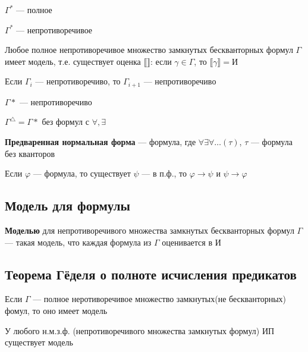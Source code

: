 \documentclass[english]{article}
\begin{document}
\begin{property}
	\(\Gamma^*\) --- полное
	\label{org2bcf8b7}
\end{property}
\begin{property}
	\(\Gamma^*\) --- непротиворечивое
	\label{org56a8999}
\end{property}
\begin{theorem}
	Любое полное непротиворечивое множество замкнутых бескванторных формул \(\Gamma\) имеет модель, т.е. существует оценка \(\llbracket \rrbracket\): если \(\gamma \in \Gamma\), то \(\llbracket \gamma \rrbracket = \text{И}\)
	\label{org725c6c0}
\end{theorem}
\begin{theorem}
	Если \(\Gamma_i\) --- непротиворечиво, то \(\Gamma_{i + 1}\) --- непротиворечиво
	\label{org693c96c}
\end{theorem}
\begin{theorem}
	\(\Gamma*\) --- непротиворечиво
	\label{orgd717523}
\end{theorem}
\begin{corollary}
	\(\Gamma^\triangle = \Gamma*\) без формул с \(\forall, \exists\)
	\label{org9267a44}
\end{corollary}
\begin{definition}
	\textbf{Предваренная нормальная форма} --- формула, где \(\forall \exists \forall \dots(\tau)\), \(\tau\) --- формула без кванторов
	\label{org50a2fe1}
\end{definition}
\begin{theorem}
	Если \(\varphi\) --- формула, то существует \(\psi\) --- в п.ф., то \(\varphi \to \psi\) и \(\psi \to \varphi\)
	\label{org04bf09a}
\end{theorem}
\subsection{Модель для формулы}
\label{sec:org5b2985d}
\begin{definition}
	\textbf{Моделью} для непротиворечивого множества замкнутых бескванторных формул \(\Gamma\) --- такая модель, что каждая формула из \(\Gamma\) оценивается в И
	\label{org8fc9248}
\end{definition}
\subsection{Теорема Гёделя о полноте исчисления предикатов}
\label{sec:org0391102}
\begin{theorem}
	Если \(\Gamma\) --- полное неротиворечивое множество замкнутых(не бескванторных) фомул, то оно имеет модель
	\label{org9a210a4}
\end{theorem}
\begin{theorem}
	У любого н.м.з.ф. (непротиворечивого множества замкнутых формул) ИП существует модель
	\label{org85b8706}
\end{theorem}
\end{document}
